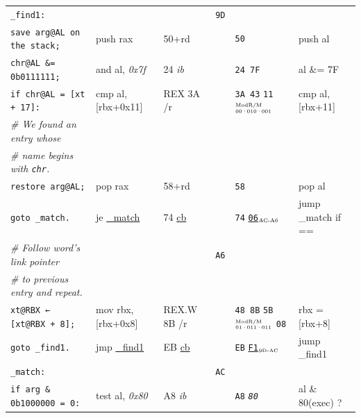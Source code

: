 \documentclass[a4paper,12pt,final]{article}
\begin{document}
\begin{table}[!htbp]
\begin{adjustwidth}{-1cm}{-1cm}
\begin{center}
\begin{tabular}{l|ll|l|lH}
\texttt{\_find1:} &  &  & \texttt{9D} &  & \\[0pt]
\hspace{1em} \texttt{save arg@AL on the stack;} & push rax & 50+rd &  & \texttt{50} & push al\\[0pt]
\hspace{1em} \texttt{chr@AL \&= 0b0111111;} & and al, \emph{0x7f} & 24 \emph{ib} &  & \texttt{24 7F} & al \&= 7F\\[0pt]
\hspace{1em} \texttt{if chr@AL = [xt + 17]:} & cmp al, [rbx+0x11] & REX 3A /r &  & \texttt{3A 43} \texttt{11}​\(^{\text{\tiny ModR/M}}_{\text{\tiny 00·010·001}}\) & cmp al, [rbx+11]\\[0pt]
\hspace{2em}     \emph{\# We found an entry whose} &  &  &  &  & \\[0pt]
\hspace{2em}     \emph{\# name begins with \texttt{chr}.} &  &  &  &  & \\[0pt]
\hspace{2em}     \texttt{restore arg@AL;} & pop rax & 58+rd &  & \texttt{58} & pop al\\[0pt]
\hspace{2em}     \texttt{goto \_match.} & je \uline{\_match} & 74 \uline{cb} &  & \texttt{74} \uline{\texttt{06}}​\(_{\text{\tiny AC-A6}}\) & jump \_match if ==\\[0pt]
\hspace{1em} \emph{\# Follow word's link pointer} &  &  & \texttt{A6} &  & \\[0pt]
\hspace{1em} \emph{\# to previous entry and repeat.} &  &  &  &  & \\[0pt]
\hspace{1em} \texttt{xt@RBX ← [xt@RBX + 8];} & mov rbx, [rbx+0x8] & REX.W 8B /r &  & \texttt{48 8B} \texttt{5B}​\(^{\text{\tiny ModR/M}}_{\text{\tiny 01·011·011}}\) \texttt{08} & rbx = [rbx+8]\\[0pt]
\hspace{1em} \texttt{goto \_find1.} & jmp \uline{\_find1} & EB \uline{cb} &  & \texttt{EB} \uline{\texttt{F1}}​\(_{\text{\tiny 9D-AC}}\) & jump \_find1\\[0pt]
\texttt{\_match:} &  &  & \texttt{AC} &  & \\[0pt]
\hspace{1em} \texttt{if arg \& 0b1000000 = 0:} & test al, \emph{0x80} & A8 \emph{ib} &  & \texttt{A8} \emph{\texttt{80}} & al \& 80(exec) ?\\[0pt]

\end{tabular}
\end{center}
\end{adjustwidth}
\end{table}
\end{document}
